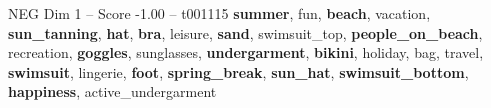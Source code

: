 \begin{textsample}{NEG Dim 1 – Score -1.00 – t001115}  \label{ex:f1_neg_039}
\textbf{summer}, fun, \textbf{beach}, vacation, \textbf{sun\_tanning}, \textbf{hat}, \textbf{bra}, leisure, \textbf{sand}, swimsuit\_top, \textbf{people\_on\_beach}, recreation, \textbf{goggles}, sunglasses, \textbf{undergarment}, \textbf{bikini}, holiday, bag, travel, \textbf{swimsuit}, lingerie, \textbf{foot}, \textbf{spring\_break}, \textbf{sun\_hat}, \textbf{swimsuit\_bottom}, \textbf{happiness}, active\_undergarment

\end{textsample}
